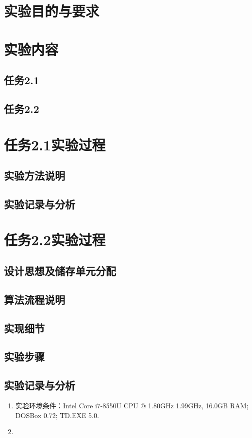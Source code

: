 \documentclass{ctexrep}
\begin{document}
\section{实验目的与要求}
\section{实验内容}
\subsection{任务2.1}
\subsection{任务2.2}
\section{任务2.1实验过程}
\subsection{实验方法说明}
\subsection{实验记录与分析}
\section{任务2.2实验过程}
\subsection{设计思想及储存单元分配}
\subsection{算法流程说明}
\subsection{实现细节}
\subsection{实验步骤}
\subsection{实验记录与分析}
\begin{enumerate}
    \item 实验环境条件：Intel Core i7-8550U CPU @ 1.80GHz 1.99GHz, 16.0GB RAM; DOSBox 0.72; TD.EXE 5.0.
    \item 
\end{enumerate}
\end{document}
